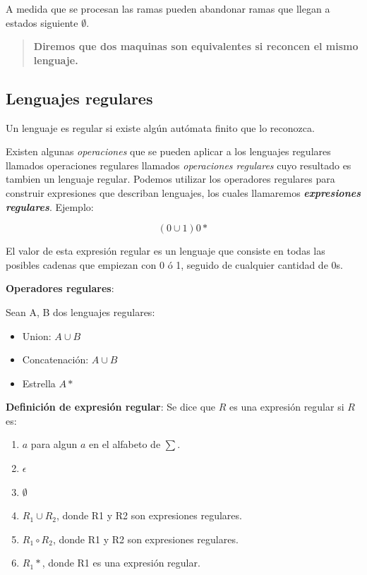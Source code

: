 \documentclass{article}
\begin{document}
A medida que se procesan las ramas pueden abandonar ramas que llegan a estados siguiente \(\emptyset\).

\begin{quote}
    \textbf{Diremos que dos maquinas son equivalentes si reconcen el mismo lenguaje.}
\end{quote}

\newpage
\subsection{Lenguajes regulares}

Un lenguaje es regular si existe algún autómata finito que lo reconozca.

Existen algunas \textit{operaciones} que se pueden aplicar a los lenguajes regulares llamados operaciones
regulares llamados \textit{operaciones regulares} cuyo resultado es tambien un lenguaje regular.
Podemos utilizar los operadores regulares para construir expresiones que describan lenguajes, los cuales
llamaremos \textit{\textbf{expresiones regulares}}. Ejemplo:

\[
    (0 \cup 1)0*
\]

El valor de esta expresión regular es un lenguaje que consiste en todas las posibles cadenas que
empiezan con 0 ó 1, seguido de cualquier cantidad de 0s.

\textbf{Operadores regulares}:

Sean A, B dos lenguajes regulares:

\begin{itemize}
    \item Union: \(A \cup B\)
    \item Concatenación: \(A \cup B\)
    \item Estrella \(A*\)
\end{itemize}

\textbf{Definición de expresión regular}:
Se dice que \(R\) es una expresión regular si \(R\) es:
\begin{enumerate}
    \item \(a\) para algun \(a\) en el alfabeto de \(\textstyle \sum\).
    \item \(\epsilon\)
    \item \(\emptyset\)
    \item \(R_1 \cup R_2\), donde R1 y R2 son expresiones regulares.
    \item \(R_1 \circ R_2\), donde R1 y R2 son expresiones regulares.
    \item \(R_1*\), donde R1 es una expresión regular.
\end{enumerate}
\end{document}
